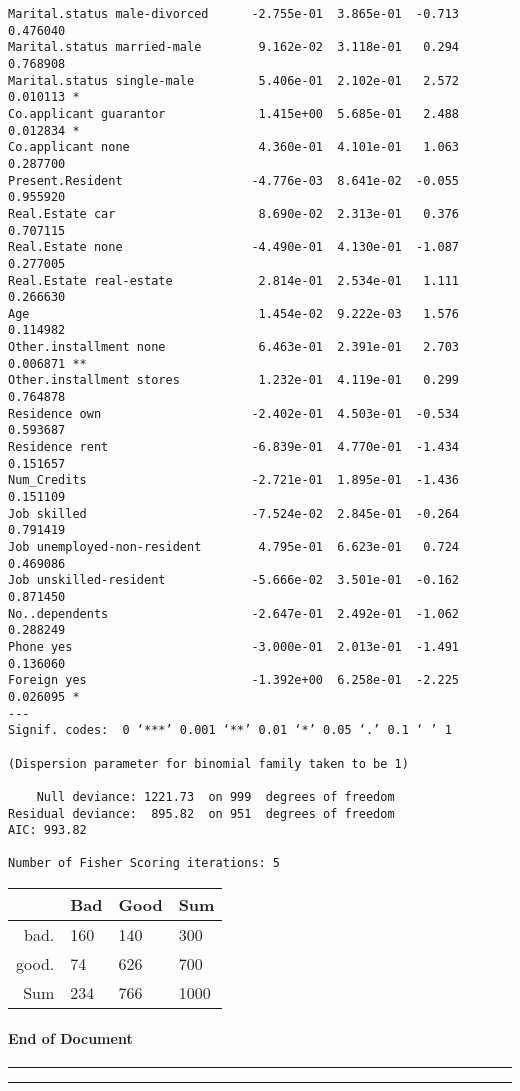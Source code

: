 \documentclass[11pt]{article}
\begin{document}
\begin{verbatim}
Marital.status male-divorced      -2.755e-01  3.865e-01  -0.713 0.476040    
Marital.status married-male        9.162e-02  3.118e-01   0.294 0.768908    
Marital.status single-male         5.406e-01  2.102e-01   2.572 0.010113 *  
Co.applicant guarantor             1.415e+00  5.685e-01   2.488 0.012834 *  
Co.applicant none                  4.360e-01  4.101e-01   1.063 0.287700    
Present.Resident                  -4.776e-03  8.641e-02  -0.055 0.955920    
Real.Estate car                    8.690e-02  2.313e-01   0.376 0.707115    
Real.Estate none                  -4.490e-01  4.130e-01  -1.087 0.277005    
Real.Estate real-estate            2.814e-01  2.534e-01   1.111 0.266630    
Age                                1.454e-02  9.222e-03   1.576 0.114982    
Other.installment none             6.463e-01  2.391e-01   2.703 0.006871 ** 
Other.installment stores           1.232e-01  4.119e-01   0.299 0.764878    
Residence own                     -2.402e-01  4.503e-01  -0.534 0.593687    
Residence rent                    -6.839e-01  4.770e-01  -1.434 0.151657    
Num_Credits                       -2.721e-01  1.895e-01  -1.436 0.151109    
Job skilled                       -7.524e-02  2.845e-01  -0.264 0.791419    
Job unemployed-non-resident        4.795e-01  6.623e-01   0.724 0.469086    
Job unskilled-resident            -5.666e-02  3.501e-01  -0.162 0.871450    
No..dependents                    -2.647e-01  2.492e-01  -1.062 0.288249    
Phone yes                         -3.000e-01  2.013e-01  -1.491 0.136060    
Foreign yes                       -1.392e+00  6.258e-01  -2.225 0.026095 *  
---
Signif. codes:  0 ‘***’ 0.001 ‘**’ 0.01 ‘*’ 0.05 ‘.’ 0.1 ‘ ’ 1

(Dispersion parameter for binomial family taken to be 1)

    Null deviance: 1221.73  on 999  degrees of freedom
Residual deviance:  895.82  on 951  degrees of freedom
AIC: 993.82

Number of Fisher Scoring iterations: 5

    \end{verbatim}

    
    \begin{tabular}{r|lll}
  & Bad & Good & Sum\\
\hline
	 bad. & 160  & 140  &  300\\
	 good. &  74  & 626  &  700\\
	Sum & 234  & 766  & 1000\\
\end{tabular}


    
    \hypertarget{end-of-document}{%
\paragraph{End of Document}\label{end-of-document}}

\begin{center}\rule{0.5\linewidth}{\linethickness}\end{center}

\begin{center}\rule{0.5\linewidth}{\linethickness}\end{center}


    
    
    
    
\end{document}
